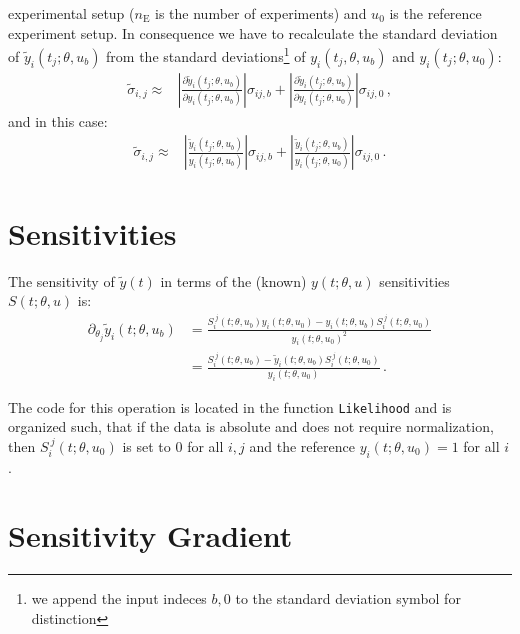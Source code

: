 \documentclass[utf8,english]{scrartcl}
\begin{document}
experimental setup ($n_{\text{E}}$ is the number of experiments) and
$u_0$ is the reference experiment setup.  In consequence we have to
recalculate the standard deviation of $\tilde y_i(t_j;\theta,u_b)$
from the standard deviations\footnote{we append the input indeces
  $b,0$ to the standard deviation symbol for distinction} of
${y_i(t_j,\theta,u_b)}$ and ${y_i(t_j;\theta,u_0)}$:
\begin{align}
  \label{eq:std_y}
  \tilde\sigma_{i,j}\approx&\left|\frac{\partial\tilde
      y_i(t_j;\theta,u_b)}{\partial
      y_i(t_j;\theta,u_b)}\right|\sigma_{ij,b} +
  \left|\frac{\partial\tilde y_i(t_j;\theta,u_b)}{\partial
      y_i(t_j;\theta,u_0)}\right|\sigma_{ij,0}\,,
\end{align}
and in this case:
\begin{align}
  \label{eq:std_yy}
  \tilde\sigma_{i,j}\approx&\left|\frac{\tilde
      y_i(t_j;\theta,u_b)}{y_i(t_j;\theta,u_b)}\right|\sigma_{ij,b} +
  \left|\frac{\tilde
      y_i(t_j;\theta,u_b)}{y_i(t_j;\theta,u_0)}\right|\sigma_{ij,0}\,.
\end{align}


\section{Sensitivities}
\label{sec:sens}

The sensitivity of $\tilde y(t)$ in terms of the (known) $y(t;\theta,u)$ sensitivities $S(t;\theta,u)$ is:
\begin{align}
  \partial_{\theta_j} \tilde y_i(t;\theta,u_b) 
  &= \frac{S_i^{~j}(t;\theta,u_b)y_i(t;\theta,u_0)
    -y_i(t;\theta,u_b)S_i^{~j}(t;\theta,u_0)}{y_i(t;\theta,u_0)^2}\nonumber\\
  &= \frac{S_i^{~j}(t;\theta,u_b) 
    - \tilde y_i(t;\theta,u_b)S_i^{~j}(t;\theta,u_0)}{y_i(t;\theta,u_0)}\,.  \label{eq:fyS}
\end{align}

The code for this operation is located in the function
\texttt{Likelihood} and is organized such, that if the data is
absolute and does not require normalization, then
$S_i^{~j}(t;\theta,u_0)$ is set to $0$ for all $i,j$ and the reference
$y_i(t;\theta,u_0)=1$ for all $i$.

\section{Sensitivity Gradient}
\label{sec:dS}
\end{document}
